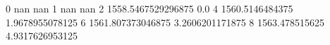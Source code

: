 0 nan nan
1 nan nan
2 1558.5467529296875 0.0
4 1560.5146484375 1.9678955078125
6 1561.807373046875 3.2606201171875
8 1563.478515625 4.9317626953125
